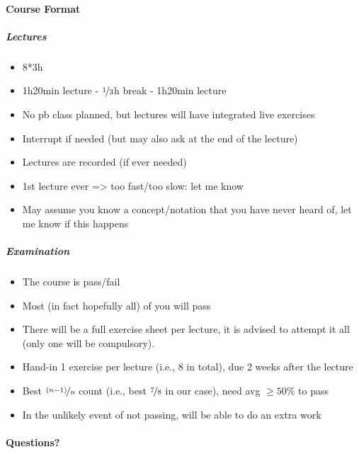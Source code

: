 \documentclass[11pt,a4paper]{report}
\begin{document}
	\paragraph{Course Format}
	\subparagraph{Lectures}
	\begin{itemize}
		\item 8*3h
		\item 1h20min lecture - $\nicefrac{1}{3}$h break - 1h20min lecture
		\item No pb class planned, but lectures will have integrated live exercises
		\item Interrupt if needed (but may also ask at the end of the lecture)
		\item Lectures are recorded (if ever needed)
		\item 1st lecture ever => too fast/too slow: let me know
		\item May assume you know a concept/notation that you have never heard of, let me know if this happens
	\end{itemize}
	\subparagraph{Examination}
	\begin{itemize}
		\item The course is pass/fail
		\item Most (in fact hopefully all) of you will pass
		\item There will be a full exercise sheet per lecture, it is advised to attempt it all (only one will be compulsory).
		\item Hand-in 1 exercise per lecture (i.e., 8 in total), due 2 weeks after the lecture
		\item Best $\nicefrac{(n-1)}{n}$ count (i.e., best $\nicefrac{7}{8}$ in our case), need avg $\geq 50 \%$ to pass
		\item In the unlikely event of not passing, will be able to do an extra work
	\end{itemize}
	\paragraph{Questions?}
	
	\newpage
	
	
	
	
	
	
	
	
	
	
	
\end{document}

